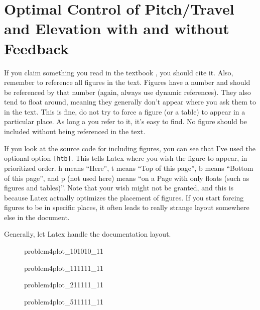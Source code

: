 \section{Optimal Control of Pitch/Travel and Elevation with and without Feedback}\label{sec:prob4}
If you claim something you read in the textbook \citep{Nocedal2006}, you should cite it. Also, remember to reference all figures in the text. Figures have a number and should be referenced by that number (again, always use dynamic references). They also tend to float around, meaning they generally don't appear where you ask them to in the text. This is fine, do not try to force a figure (or a table) to appear in a particular place. As long a you refer to it, it's easy to find. No figure should be included without being referenced in the text. 

If you look at the source code for including figures, you can see that I've used the optional option \verb+[htb]+. This tells Latex where you wish the figure to appear, in prioritized order. h means ``Here'', t means ``Top of this page'', b means ``Bottom of this page'', and p (not used here) means ``on a Page with only floats (such as figures and tables)''. Note that your wish might not be granted, and this is because Latex actually optimizes the placement of figures. If you start forcing figures to be in specific places, it often leads to really strange layout somewhere else in the document. 

Generally, let Latex handle the documentation layout.


\begin{figure}[htbp]
	\centering
	\caption{problem4plot\_101010\_11}
	\label{fig:problem4plot_101010_11}%
\end{figure}

\begin{figure}[htbp]
	\centering
	\caption{problem4plot\_111111\_11}
	\label{fig:problem4plot_111111_11}%
\end{figure}

\begin{figure}[htbp]
	\centering
	\caption{problem4plot\_211111\_11}
	\label{fig:}%
\end{figure}

\begin{figure}[htbp]
	\centering
	\caption{problem4plot\_511111\_11}
	\label{fig:problem4plot_511111_11}%
\end{figure}


